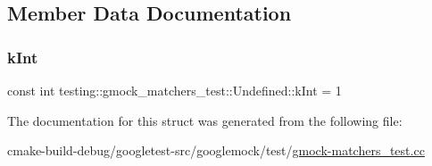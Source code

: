 \subsection{Member Data Documentation}
\mbox{\label{structtesting_1_1gmock__matchers__test_1_1Undefined_a59bddeb8647abbf50ee51b8ca8f0989b}} 
\subsubsection{\texorpdfstring{kInt}{kInt}}
{\footnotesize\ttfamily const int testing\+::gmock\+\_\+matchers\+\_\+test\+::\+Undefined\+::k\+Int = 1\hspace{0.3cm}{\ttfamily [static]}}



The documentation for this struct was generated from the following file\+:\begin{DoxyCompactItemize}
\item 
cmake-\/build-\/debug/googletest-\/src/googlemock/test/\mbox{\hyperlink{gmock-matchers__test_8cc}{gmock-\/matchers\+\_\+test.\+cc}}\end{DoxyCompactItemize}
